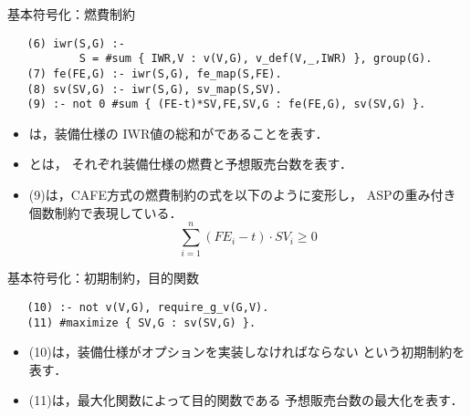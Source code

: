 \documentclass[dvipdfmx, 11pt]{beamer}
\begin{document}
\begin{frame}[fragile]{基本符号化：燃費制約}
 \begin{exampleblock}{}
  \small
  \begin{lstlisting}
   (6) iwr(S,G) :- 
           S = #sum { IWR,V : v(V,G), v_def(V,_,IWR) }, group(G).
   (7) fe(FE,G) :- iwr(S,G), fe_map(S,FE).
   (8) sv(SV,G) :- iwr(S,G), sv_map(S,SV).
   (9) :- not 0 #sum { (FE-t)*SV,FE,SV,G : fe(FE,G), sv(SV,G) }.
  \end{lstlisting}
 \end{exampleblock}
 \begin{itemize}
  \item {}は，装備仕様の
	IWR値の総和がであることを表す．
  \item {}とは，
	それぞれ装備仕様の燃費と予想販売台数を表す．
  \item (9)は，CAFE方式の燃費制約の式を以下のように変形し，
	ASPの重み付き個数制約で表現している．
	\[
	 \sum_{i=1}^{n} (FE_{i}-t)\cdot SV_{i} \geq 0
	\]
 \end{itemize}
\end{frame}
\begin{frame}[fragile]{基本符号化：初期制約，目的関数}
 \begin{exampleblock}{}
  \begin{lstlisting}
   (10) :- not v(V,G), require_g_v(G,V).
   (11) #maximize { SV,G : sv(SV,G) }.
  \end{lstlisting}
 \end{exampleblock}
 \begin{itemize}
  \item (10)は，装備仕様がオプションを実装しなければならない
	という初期制約を表す．
  \item (11)は，最大化関数によって目的関数である
	予想販売台数の最大化を表す．
 \end{itemize}
\end{frame}
\end{document}
